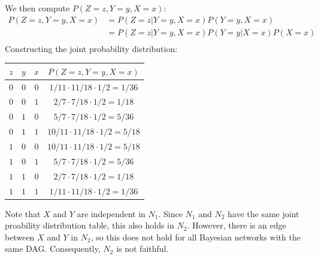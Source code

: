 \documentclass{article}
\begin{document}
We then compute $P(Z = z, Y = y, X = x)$:
\begin{align*}
    P(Z = z, Y = y, X = x) & = P(Z = z|Y = y, X = x)P(Y = y, X = x) \\
    & = P(Z = z|Y = y, X = x)P(Y = y | X = x)P(X = x) \\
\end{align*}
Constructing the joint probability distribution:
\begin{center}
\begin{tabular}{|c|c|c|c|}
    \hline
    $z$ & $y$ & $x$ & $P(Z = z, Y = y, X = x)$ \\
    \hline
    $0$ & $0$ & $0$ & $1/11 \cdot 11/18 \cdot 1/2 = 1/36$ \\
    \hline
    $0$ & $0$ & $1$ & $2/7 \cdot 7/18 \cdot 1/2 = 1/18$ \\
    \hline
    $0$ & $1$ & $0$ & $5/7 \cdot 7/18 \cdot 1/2 = 5/36$ \\
    \hline
    $0$ & $1$ & $1$ & $10/11 \cdot 11/18 \cdot 1/2 = 5/18$ \\
    \hline
    $1$ & $0$ & $0$ & $10/11 \cdot 11/18 \cdot 1/2 = 5/18$ \\
    \hline
    $1$ & $0$ & $1$ & $5/7 \cdot 7/18 \cdot 1/2 = 5/36$ \\
    \hline
    $1$ & $1$ & $0$ & $2/7 \cdot 7/18 \cdot 1/2 = 1/18$ \\
    \hline
    $1$ & $1$ & $1$ & $1/11 \cdot 11/18 \cdot 1/2 = 1/36$ \\
    \hline
\end{tabular}
\end{center}

\clearpage
\problem{}
Note that $X$ and $Y$ are independent in $N_1$. Since $N_1$ and $N_2$ have the same joint proability distribution table, this also holds in $N_2$. However, there is an edge between $X$ and $Y$ in $N_2$, so this does not hold for all Bayesian networks with the same DAG. Consequently, $N_2$ is not faithful.
\end{document}
